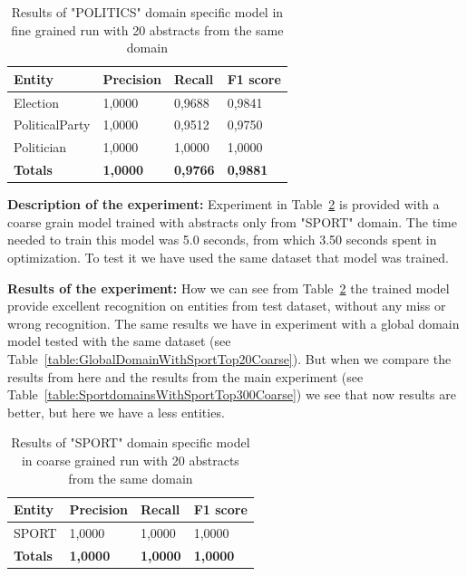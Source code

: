 \documentclass[thesis=M,english]{FITthesis}[2018/05/30]
\begin{document}
	\begin{table}[H]\centering
		\begin{tabular}{|l|l|l|l|}
			\hline {\textbf{Entity}} & {\textbf{Precision}} & {\textbf{Recall}} & {\textbf{F1 score}}\\\hline
				Election & 1,0000 & 0,9688 & 0,9841\\
				PoliticalParty & 1,0000 & 0,9512 & 0,9750\\
				Politician & 1,0000 & 1,0000 & 1,0000\\\hline
				\textbf{Totals} & \textbf{1,0000} & \textbf{0,9766} & \textbf{0,9881}\\\hline
		\end{tabular}
		\caption{Results of "POLITICS" domain specific model in fine grained run with 20 abstracts from the same domain \label{table:PoliticsDomainWithPoliticsTop20Fine}}	
	\end{table}


\textbf{Description of the experiment:} Experiment in Table~\ref{table:SportDomainWithSportTop20Coarse} is provided with a coarse grain model trained with abstracts only from "SPORT" domain. The time needed to train this model was 5.0 seconds, from which 3.50 seconds spent in optimization. To test it we have used the same dataset that model was trained.

\textbf{Results of the experiment:} How we can see from Table~\ref{table:SportDomainWithSportTop20Coarse} the trained model provide excellent recognition on entities from test dataset, without any miss or wrong recognition. The same results we have in experiment with a global domain model tested with the same dataset (see Table~\ref{table:GlobalDomainWithSportTop20Coarse}). But when we compare the results from here and the results from the main experiment (see Table~\ref{table:SportdomainsWithSportTop300Coarse}) we see that now results are better, but here we have a less entities.   
	
	\begin{table}[H]\centering
		\begin{tabular}{|l|l|l|l|}
			\hline {\textbf{Entity}} & {\textbf{Precision}} & {\textbf{Recall}} & {\textbf{F1 score}}\\\hline
				SPORT & 1,0000 & 1,0000 & 1,0000\\\hline
				\textbf{Totals} & \textbf{1,0000} & \textbf{1,0000} & \textbf{1,0000}\\\hline
		\end{tabular}
		\caption{Results of "SPORT" domain specific model in coarse grained run with 20 abstracts from the same domain \label{table:SportDomainWithSportTop20Coarse}}			
	\end{table}	
	
\end{document}
